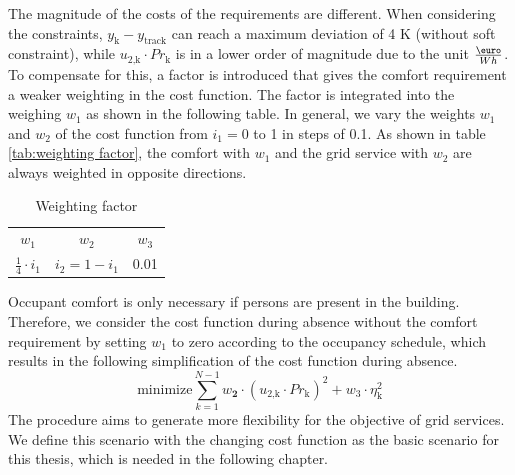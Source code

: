 The magnitude of the costs of the requirements are different. When considering the constraints, $y_\text{k}-y_\text{track}$ can reach a maximum deviation of 4 K (without soft constraint), while $u_\text{2,k}\cdot Pr_\text{k}$ is in a lower order of magnitude due to the unit $\frac{\text{\euro}}{Wh}$. To compensate for this, a factor is introduced that gives the comfort requirement a weaker weighting in the cost function. The factor is integrated into the weighing $w_\text{1}$ as shown in the following table. In general, we vary the weights $w_\text{1}$ and $w_\text{2}$ of the cost function from $ i_{1}= 0$ to 1 in steps of 0.1. As shown in table \autoref{tab:weighting factor}, the comfort with $w_\text{1}$ and the grid service with $w_\text{2}$ are always weighted in opposite directions.\newline
\begin{table}[h]
    \centering
    \begin{tabular}{c|c|c}
         $w_\text{1}$ & $w_\text{2}$ & $w_\text{3}$ \\
        $\frac{1}{4} \cdot i_\text{1}$ & $i_\text{2}=1-i_\text{1}$ & 0.01
    \end{tabular}
    \caption{Weighting factor}
    \label{tab:weighting factor}
\end{table}
Occupant comfort is only necessary if persons are present in the building. Therefore, we consider the cost function during absence without the comfort requirement by setting $w_\text{1}$ to zero according to the occupancy schedule, which results in the following simplification of the cost function during absence.
    \begin{equation}
        \text{minimize} \sum_{k=1}^{N-1} w_\textbf{2}\cdot(u_\text{2,k}\cdot Pr_\text{k})^2 + w_\text{3} \cdot \eta_\text{k}^2
        \label{eq:costfunctionAbwesenheit}
    \end{equation}
The procedure aims to generate more flexibility for the objective of grid services. We define this scenario with the changing cost function as the basic scenario for this thesis, which is needed in the following chapter.  %

